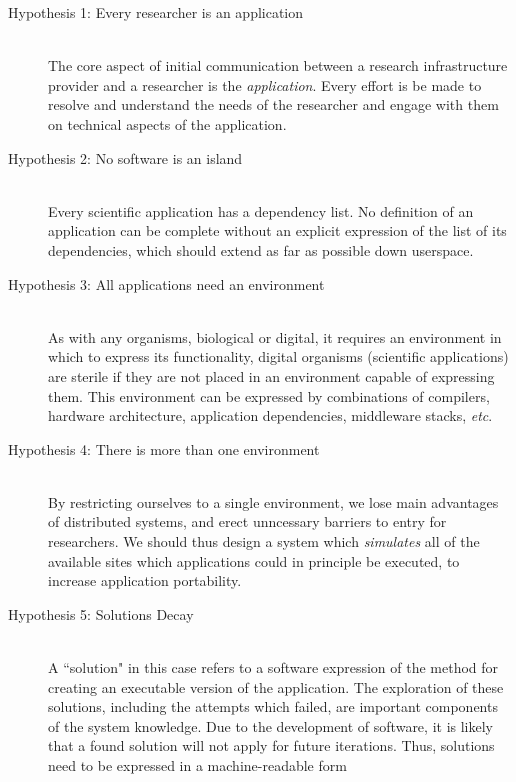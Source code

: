 \documentclass[a4paper]{jpconf}
\begin{document}
	\begin{description}
		\item[Hypothesis 1: Every researcher is an application] \hfill \\
        The core aspect of initial communication between a research infrastructure provider and a
            researcher is the {\it application}. Every effort is be made to resolve and
            understand the needs of the researcher and engage with them on
            technical aspects of the application.
		\item[Hypothesis 2: No software is an island] \hfill \\
        Every scientific application has a dependency list. No definition of an application can be
            complete without an explicit expression of the list of its dependencies, which should
            extend as far as possible down userspace.
		\item[Hypothesis 3: All applications need an environment] \hfill \\
        As with any organisms, biological or digital, it requires an environment in which to 
            express its functionality,
            digital organisms (scientific applications) are sterile if they are not placed in an
            environment capable of expressing them. This environment can be expressed by
            combinations of compilers, hardware architecture, application dependencies, middleware
            stacks, {\it etc}.
		\item[Hypothesis 4: There is more than one environment] \hfill \\
        By restricting ourselves to a single environment, we lose main advantages of distributed
            systems, and erect unncessary barriers to entry for researchers. We should thus design a
            system which {\it simulates} all of the available sites which applications could in
            principle be executed, to increase application portability.
		\item[Hypothesis 5: Solutions Decay] \hfill \\
        A ``solution" in this case refers to a software expression of the method for creating an
            executable version of the application. The exploration of these solutions, including the
            attempts which failed, are important components of the system knowledge. Due to
            the development of software, it is likely that a found solution will not apply for
            future iterations. Thus, solutions need to be expressed in a machine-readable form {\it
}
\end{description}
\end{document}
